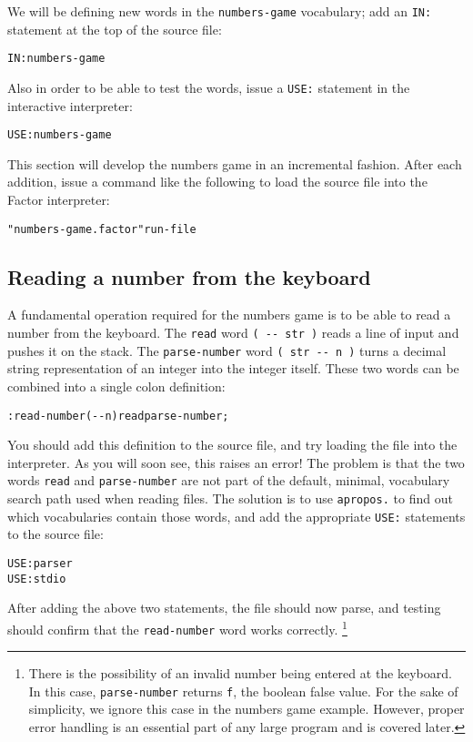\documentclass[english]{article}
\begin{document}
We will be defining new words in the \texttt{numbers-game} vocabulary; add
an \texttt{IN:} statement at the top of the source file:

\begin{alltt}
IN: numbers-game
\end{alltt}
Also in order to be able to test the words, issue a \texttt{USE:}
statement in the interactive interpreter:

\begin{alltt}
USE: numbers-game
\end{alltt}
This section will develop the numbers game in an incremental fashion.
After each addition, issue a command like the following to load the
source file into the Factor interpreter:

\begin{alltt}
"numbers-game.factor" run-file
\end{alltt}

\subsection{Reading a number from the keyboard}

A fundamental operation required for the numbers game is to be able
to read a number from the keyboard. The \texttt{read} word \texttt{(
-{}- str )} reads a line of input and pushes it on the stack.
The \texttt{parse-number} word \texttt{( str -{}- n )} turns a decimal
string representation of an integer into the integer itself. These
two words can be combined into a single colon definition:

\begin{alltt}
: read-number ( -{}- n ) read parse-number ;
\end{alltt}
You should add this definition to the source file, and try loading
the file into the interpreter. As you will soon see, this raises an
error! The problem is that the two words \texttt{read} and \texttt{parse-number}
are not part of the default, minimal, vocabulary search path used
when reading files. The solution is to use \texttt{apropos.} to find
out which vocabularies contain those words, and add the appropriate
\texttt{USE:} statements to the source file:

\begin{alltt}
USE: parser
USE: stdio
\end{alltt}
After adding the above two statements, the file should now parse,
and testing should confirm that the \texttt{read-number} word works correctly.%
\footnote{There is the possibility of an invalid number being entered at the
keyboard. In this case, \texttt{parse-number} returns \texttt{f},
the boolean false value. For the sake of simplicity, we ignore this
case in the numbers game example. However, proper error handling is
an essential part of any large program and is covered later.%
}
\end{document}
